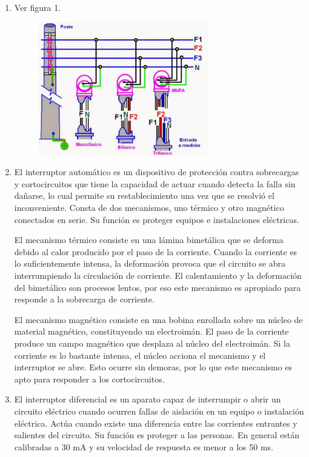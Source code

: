 \begin{enumerate}
\item %
Ver figura 1.
\begin{figure}
        \centering
        \includegraphics[width=0.7\textwidth]{Imagenes/Seguridad/S3/monofasico-bifasico-y-trifasico.jpg}
        \caption{}
        \label{fig:my_label}
    \end{figure}
\item %
El interruptor automático es un dispositivo de protección contra sobrecargas y cortocircuitos que tiene la capacidad de actuar cuando detecta la falla sin dañarse, lo cual permite su restablecimiento una vez que se resolvió el inconveniente. Consta de dos mecanismos, uno térmico y otro magnético conectados en serie. Su función es proteger equipos e instalaciones eléctricas.

El mecanismo térmico consiste en una lámina bimetálica que se deforma debido al calor producido por el paso de la corriente. Cuando la corriente es lo suficientemente intensa, la deformación provoca que el circuito se abra interrumpiendo la circulación de corriente. El calentamiento y la deformación del bimetálico son procesos lentos, por eso este mecanismo es apropiado para responde a la sobrecarga de corriente.

El mecanismo magnético consiste en una bobina enrollada sobre un núcleo de material magnético, constituyendo un electroimán. El paso de la corriente produce un campo magnético que desplaza al núcleo del electroimán. Si la corriente es lo bastante intensa, el núcleo acciona el mecanismo y el interruptor se abre. Esto ocurre sin demoras, por lo que este mecanismo es apto para responder a los cortocircuitos.

\item %
El interruptor diferencial es un aparato capaz de interrumpir o abrir un circuito eléctrico cuando ocurren fallas de aislación en un equipo o instalación eléctrica. Actúa cuando existe una diferencia entre las corrientes entrantes y salientes del circuito. Su función es proteger a las personas. En general están calibradas a 30 mA y su velocidad de respuesta es menor a los 50 ms.


\end{enumerate}
